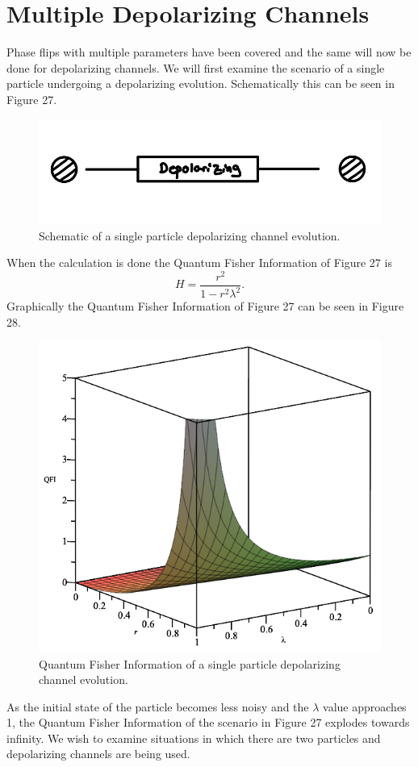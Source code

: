 \documentclass[twocolumn]{article}
\begin{document}
\section*{Multiple Depolarizing Channels}
Phase flips with multiple parameters have been covered and the same will now be done for depolarizing channels. We will first examine the scenario of a single particle undergoing a depolarizing evolution. Schematically this can be seen in Figure 27.
\newpage
\begin{figure}[h]
\begin{center}
\includegraphics[width=0.65\linewidth]{Depolarizing-Single-Channel-Lambda-Schematic.jpg}
\caption{Schematic of a single particle depolarizing channel evolution.}
\end{center}
\end{figure}
When the calculation is done the Quantum Fisher Information of Figure 27 is
\begin{equation}\label{eq:103}
H=\frac{r^2}{1-r^2\lambda^2}.
\end{equation}
Graphically the Quantum Fisher Information of Figure 27 can be seen in Figure 28.
\begin{figure}[h]
\begin{center}
\includegraphics[width=0.65\linewidth]{Depolarizing-Single-Channel-QFI.png}
\caption{Quantum Fisher Information of a single particle depolarizing channel evolution.}
\end{center}
\end{figure}
\newline
As the initial state of the particle becomes less noisy and the $\lambda$ value approaches 1, the Quantum Fisher Information of the scenario in Figure 27 explodes towards infinity. We wish to examine situations in which there are two particles and depolarizing channels are being used.
\end{document}
